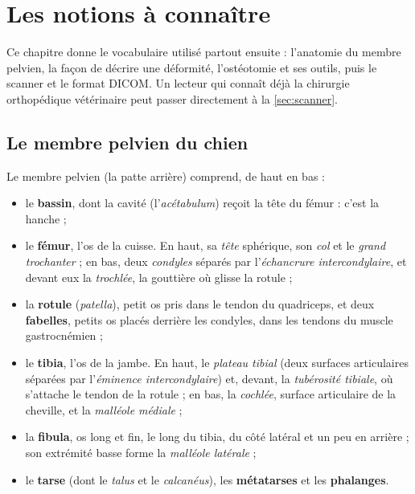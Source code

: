 \chapter{Les notions à connaître}
\label{chap:notions}

\begin{chapeau}
Ce chapitre donne le vocabulaire utilisé partout ensuite : l'anatomie du membre pelvien, la façon de décrire une
déformité, l'ostéotomie et ses outils, puis le scanner et le format DICOM. Un lecteur qui connaît déjà la chirurgie
orthopédique vétérinaire peut passer directement à la \cref{sec:scanner}.
\end{chapeau}

\section{Le membre pelvien du chien}

Le membre pelvien (la patte arrière) comprend, de haut en bas :
\begin{itemize}
  \item le \textbf{bassin}, dont la cavité (l'\emph{acétabulum}) reçoit la tête du fémur : c'est la hanche ;
  \item le \textbf{fémur}, l'os de la cuisse. En haut, sa \emph{tête} sphérique, son \emph{col} et le \emph{grand
  trochanter} ; en bas, deux \emph{condyles} séparés par l'\emph{échancrure intercondylaire}, et devant eux la
  \emph{trochlée}, la gouttière où glisse la rotule ;
  \item la \textbf{rotule} (\emph{patella}), petit os pris dans le tendon du quadriceps, et deux \textbf{fabelles},
  petits os placés derrière les condyles, dans les tendons du muscle gastrocnémien ;
  \item le \textbf{tibia}, l'os de la jambe. En haut, le \emph{plateau tibial} (deux surfaces articulaires séparées
  par l'\emph{éminence intercondylaire}) et, devant, la \emph{tubérosité tibiale}, où s'attache le tendon de la
  rotule ; en bas, la \emph{cochlée}, surface articulaire de la cheville, et la \emph{malléole médiale} ;
  \item la \textbf{fibula}, os long et fin, le long du tibia, du côté latéral et un peu en arrière ; son extrémité
  basse forme la \emph{malléole latérale} ;
  \item le \textbf{tarse} (dont le \emph{talus} et le \emph{calcanéus}), les \textbf{métatarses} et les
  \textbf{phalanges}.
\end{itemize}

